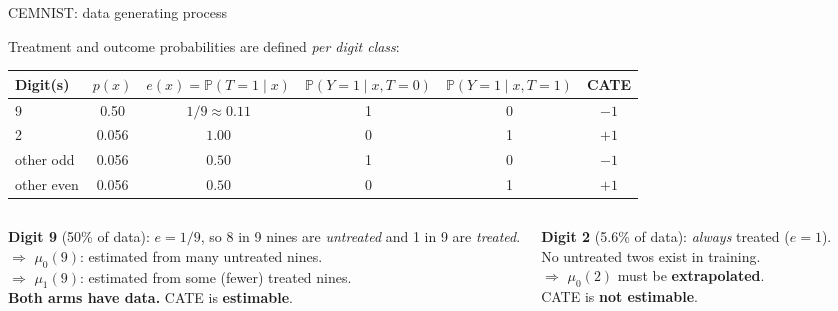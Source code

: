 \documentclass[aspectratio=169]{beamer}
\newcommand{\Prob}{\mathbb{P}}
\begin{document}
\begin{frame}{CEMNIST: data generating process}

Treatment and outcome probabilities are defined \emph{per digit class}:

\begin{center}
\small
\renewcommand{\arraystretch}{1.3}
\begin{tabular}{lccccc}
\toprule
Digit(s) & $p(x)$ & $e(x)=\Prob(T{=}1\mid x)$ & $\Prob(Y{=}1\mid x,T{=}0)$ & $\Prob(Y{=}1\mid x,T{=}1)$ & CATE \\
\midrule
9          & 0.50  & $1/9 \approx 0.11$ & 1 & 0 & $-1$ \\
2          & 0.056 & $1.00$             & 0 & 1 & $+1$ \\
other odd  & 0.056 & $0.50$             & 1 & 0 & $-1$ \\
other even & 0.056 & $0.50$             & 0 & 1 & $+1$ \\
\bottomrule
\end{tabular}
\end{center}

\bigskip
\begin{columns}
\textbf{Digit 9} (50\% of data): $e=1/9$, so
8 in 9 nines are \emph{untreated} and 1 in 9 are \emph{treated}.\\
$\Rightarrow$ $\mu_0(9)$: estimated from many untreated nines.\\
$\Rightarrow$ $\mu_1(9)$: estimated from some (fewer) treated nines.\\
\textbf{Both arms have data.} CATE is \textbf{estimable}.

\textbf{Digit 2} (5.6\% of data): \emph{always} treated ($e=1$).\\
No untreated twos exist in training.\\
$\Rightarrow$ $\mu_0(2)$ must be \textbf{extrapolated}.\\
CATE is \textbf{not estimable}.
\end{columns}
\end{frame}
\end{document}
